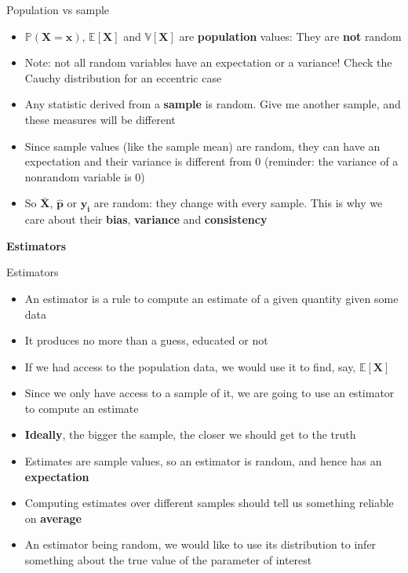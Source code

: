 \documentclass[
  ignorenonframetext,
  aspectratio=169]{beamer}
\providecommand{\tightlist}{%
  \setlength{\itemsep}{0pt}\setlength{\parskip}{0pt}}
\begin{document}
\begin{frame}{Population vs sample}
\protect\hypertarget{population-vs-sample}{}
\begin{itemize}
\tightlist
\item
  \(\bm{\mathbb{P}(X=x)}\), \(\bm{\mathbb{E}[X]}\) and
  \(\bm{\mathbb{V}[X]}\) are \textbf{population} values: They are
  \textbf{not} random
\item
  Note: not all random variables have an expectation or a variance!
  Check the Cauchy distribution for an eccentric case
\item
  Any statistic derived from a \textbf{sample} is random. Give me
  another sample, and these measures will be different
\item
  Since sample values (like the sample mean) are random, they can have
  an expectation and their variance is different from 0 (reminder: the
  variance of a nonrandom variable is 0)
\item
  So \(\bm{\bar{X}}\), \(\bm{\hat{p}}\) or \(\bm{\hat{y}_i}\) are
  random: they change with every sample. This is why we care about their
  \textbf{bias}, \textbf{variance} and \textbf{consistency}
\end{itemize}
\end{frame}

\begin{frame}{}
\protect\hypertarget{section-2}{}
\begin{center} \label{estimators}
\LARGE{ \textbf{  Estimators} }
\end{center}
\end{frame}

\begin{frame}{Estimators}
\protect\hypertarget{estimators}{}
\begin{itemize}
\tightlist
\item
  An estimator is a rule to compute an estimate of a given quantity
  given some data
\item
  It produces no more than a guess, educated or not
\item
  If we had access to the population data, we would use it to find, say,
  \(\bm{\mathbb{E}[X]}\)
\item
  Since we only have access to a sample of it, we are going to use an
  estimator to compute an estimate
\item
  \textbf{Ideally}, the bigger the sample, the closer we should get to
  the truth
\item
  Estimates are sample values, so an estimator is random, and hence has
  an \textbf{expectation}
\item
  Computing estimates over different samples should tell us something
  reliable on \textbf{average}
\item
  An estimator being random, we would like to use its distribution to
  infer something about the true value of the parameter of interest
\end{itemize}
\end{frame}
\end{document}
